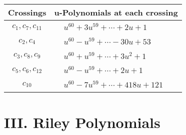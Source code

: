 \documentclass[1p]{elsarticle_modified}
\theoremstyle{definition}
\begin{document}
\begin{tabular}{m{50pt}|m{274pt}}
Crossings & \hspace{64pt}u-Polynomials at each crossing \\
\hline $$\begin{aligned}c_{1},c_{7},c_{11}\end{aligned}$$&$\begin{aligned}
&u^{60}+3 u^{59}+\cdots+2 u+1
\end{aligned}$\\
\hline $$\begin{aligned}c_{2},c_{4}\end{aligned}$$&$\begin{aligned}
&u^{60}- u^{59}+\cdots-30 u+53
\end{aligned}$\\
\hline $$\begin{aligned}c_{3},c_{8},c_{9}\end{aligned}$$&$\begin{aligned}
&u^{60}+u^{59}+\cdots+3 u^2+1
\end{aligned}$\\
\hline $$\begin{aligned}c_{5},c_{6},c_{12}\end{aligned}$$&$\begin{aligned}
&u^{60}- u^{59}+\cdots+2 u+1
\end{aligned}$\\
\hline $$\begin{aligned}c_{10}\end{aligned}$$&$\begin{aligned}
&u^{60}-7 u^{59}+\cdots+418 u+121
\end{aligned}$\\
\hline
\end{tabular}\newpage\renewcommand{\arraystretch}{1}
\centering \section*{ III. Riley Polynomials}
\end{document}
